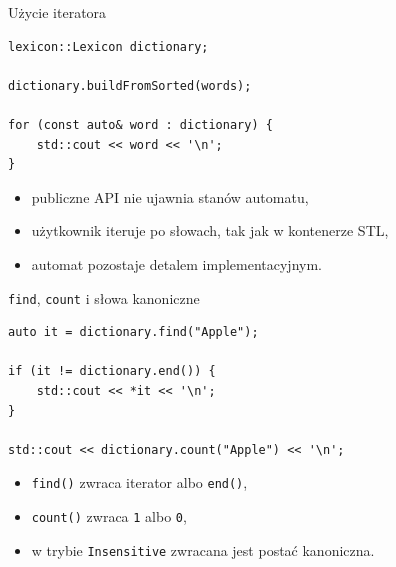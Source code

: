 \documentclass{beamer}
\begin{document}
\begin{frame}[fragile]{Użycie iteratora}
    \begin{verbatim}
lexicon::Lexicon dictionary;

dictionary.buildFromSorted(words);

for (const auto& word : dictionary) {
    std::cout << word << '\n';
}
\end{verbatim}

    \begin{itemize}
        \item publiczne API nie ujawnia stanów automatu,
        \item użytkownik iteruje po słowach, tak jak w kontenerze STL,
        \item automat pozostaje detalem implementacyjnym.
    \end{itemize}
\end{frame}


\begin{frame}[fragile]{\texttt{find}, \texttt{count} i słowa kanoniczne}
    \begin{verbatim}
auto it = dictionary.find("Apple");

if (it != dictionary.end()) {
    std::cout << *it << '\n';
}

std::cout << dictionary.count("Apple") << '\n';
\end{verbatim}

    \begin{itemize}
        \item \texttt{find()} zwraca iterator albo \texttt{end()},
        \item \texttt{count()} zwraca \texttt{1} albo \texttt{0},
        \item w trybie \texttt{Insensitive} zwracana jest postać kanoniczna.
    \end{itemize}
\end{frame}
\end{document}
